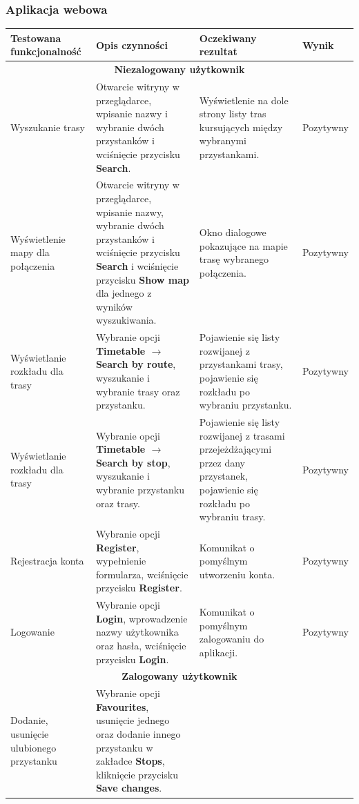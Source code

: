 \documentclass[10pt,a4paper]{article}
\begin{document}
\subsubsection{Aplikacja webowa}
\begin{tabularx}{\textwidth}{|X|X|X|l|}
	\hline
	\textbf{Testowana funkcjonalność} & \textbf{Opis czynności} & \textbf{Oczekiwany rezultat} & \textbf{Wynik} \\
	\hline
	\multicolumn{4}{|c|}{\textbf{Niezalogowany użytkownik}} \\
	\hline
	Wyszukanie trasy &
	Otwarcie witryny w przeglądarce, wpisanie nazwy i wybranie dwóch przystanków i wciśnięcie przycisku \textbf{Search}. &
	Wyświetlenie na dole strony listy tras kursujących między wybranymi przystankami. &
	Pozytywny \\
	\hline
	Wyświetlenie mapy dla połączenia &
	Otwarcie witryny w przeglądarce, wpisanie nazwy, wybranie dwóch przystanków i wciśnięcie przycisku \textbf{Search} i wciśnięcie przycisku \textbf{Show map} dla jednego z wyników wyszukiwania. &
	Okno dialogowe pokazujące na mapie trasę wybranego połączenia. &
	Pozytywny \\
	\hline
	Wyświetlanie rozkładu dla trasy &
	Wybranie opcji \textbf{Timetable $\rightarrow$ Search by route}, wyszukanie i wybranie trasy oraz przystanku. &
	Pojawienie się listy rozwijanej z przystankami trasy, pojawienie się rozkładu po wybraniu przystanku. &
	Pozytywny \\
	\hline
	Wyświetlanie rozkładu dla trasy &
	Wybranie opcji \textbf{Timetable $\rightarrow$ Search by stop}, wyszukanie i wybranie przystanku oraz trasy. &
	Pojawienie się listy rozwijanej z trasami przejeżdżającymi przez dany przystanek, pojawienie się rozkładu po wybraniu trasy. &
	Pozytywny \\
	\hline
	Rejestracja konta &
	Wybranie opcji \textbf{Register}, wypełnienie formularza, wciśnięcie przycisku \textbf{Register}. &
	Komunikat o pomyślnym utworzeniu konta. &
	Pozytywny \\
	\hline
	Logowanie &
	Wybranie opcji \textbf{Login}, wprowadzenie nazwy użytkownika oraz hasła, wciśnięcie przycisku \textbf{Login}. &
	Komunikat o pomyślnym zalogowaniu do aplikacji. &
	Pozytywny \\
	\hline
	\multicolumn{4}{|c|}{\textbf{Zalogowany użytkownik}} \\
	\hline
	Dodanie, usunięcie ulubionego przystanku &
	Wybranie opcji \textbf{Favourites}, usunięcie jednego oraz dodanie innego przystanku w zakładce \textbf{Stops}, kliknięcie przycisku \textbf{Save changes}. &

\end{tabularx}
\end{document}
